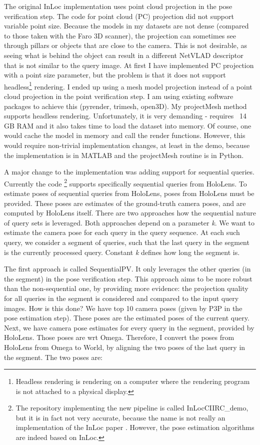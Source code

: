 \documentclass[twoside]{ctuthesis}
\theoremstyle{plain}
\theoremstyle{definition}
\theoremstyle{note}
\newcommand{\topPE}{10} %
\begin{document}
The original InLoc implementation uses point cloud projection in the pose verification step. The code for point cloud (PC) projection did not support variable point size. Because the models in my datasets are not dense (compared to those taken with the Faro 3D scanner), the projection can sometimes see through pillars or objects that are close to the camera. This is not desirable, as seeing what is behind the object can result in a different NetVLAD descriptor that is not similar to the query image. At first I have implemented PC projection with a point size parameter, but the problem is that it does not support headless\footnote{Headless rendering is rendering on a computer where the rendering program is not attached to a physical display.} rendering. I ended up using a mesh model projection instead of a point cloud projection in the point verification step. I am using existing software packages to achieve this (pyrender, trimesh, open3D). My projectMesh method supports headless rendering. Unfortunately, it is very demanding - requires ~14 GB RAM and it also takes time to load the dataset into memory. Of course, one would cache the model in memory and call the render functions. However, this would require non-trivial implementation changes, at least in the demo, because the implementation is in MATLAB and the projectMesh routine is in Python.

A major change to the implementation was adding support for sequential queries. Currently the code \footnote{The repository implementing the new pipeline is called InLocCIIRC\_demo, but it is in fact not very accurate, because the name is not really an implementation of the InLoc paper \cite{taira2018inloc}. However, the pose estimation algorithms are indeed based on InLoc.} supports specifically sequential queries from HoloLens. To estimate poses of sequential queries from HoloLens, poses from HoloLens must be provided. These poses are estimates of the ground-truth camera poses, and are computed by HoloLens itself. There are two approaches how the sequential nature of query sets is leveraged. Both approaches depend on a parameter \emph{k}. We want to estimate the camera pose for each query in the query sequence. At each such query, we consider a segment of queries, such that the last query in the segment is the currently processed query. Constant \emph{k} defines how long the segment is.

The first approach is called SequentialPV. It only leverages the other queries (in the segment) in the pose verification step. This approach aims to be more robust than the non-sequential one, by providing more evidence: the projection quality for all queries in the segment is considered and compared to the input query images. How is this done? We have top \topPE{} camera poses (given by P3P in the pose estimation step). These poses are the estimated poses of the current query. Next, we have camera pose estimates for every query in the segment, provided by HoloLens. Those poses are wrt Omega. Therefore, I convert the poses from HoloLens from Omega to World, by aligning the two poses of the last query in the segment. The two poses are:
\end{document}

